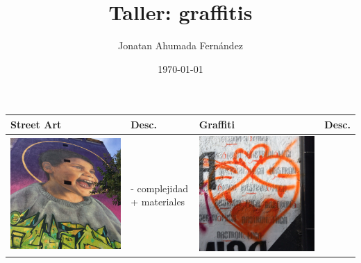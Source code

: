 \documentclass[11pt]{article}
\author{Jonatan Ahumada Fernández}
\date{\today}
\title{Taller: graffitis}
\begin{document}
\maketitle
\tableofcontents

\begin{center}
\begin{tabular}{llll}
\hline
Street Art & Desc. & Graffiti & Desc.\\
\hline
\includegraphics[width=.9\linewidth]{./graffitti/ninio.JPG} & - complejidad + materiales & \includegraphics[width=.9\linewidth]{./graffitti/gffti1.JPG} & \\

\end{tabular}
\end{center}
\end{document}
